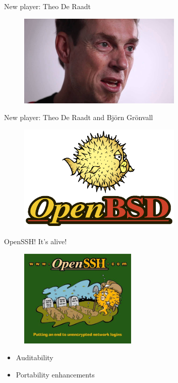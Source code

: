 \documentclass[10pt, compress, aspectratio=169]{beamer}
\begin{document}
\begin{frame}{New player: Theo De Raadt}
  \begin{figure}[ht]
    \centering
    \includegraphics[width=0.7\textwidth, keepaspectratio=true]{images/theoDeRaadt.jpg}
  \end{figure}
\end{frame}

\begin{frame}{New player: Theo De Raadt and Björn Grönvall}
  \begin{figure}[ht]
    \centering
    \includegraphics[width=0.7\textwidth, keepaspectratio=true]{images/openbsd.png}
  \end{figure}
\end{frame}

\begin{frame}{OpenSSH! It's alive!}
  \begin{figure}[ht]
    \centering
    \includegraphics[width=0.5\textwidth, keepaspectratio=true]{images/openssh.jpg}
  \end{figure}
  \begin{itemize}
    \item Auditability
    \item Portability enhancements
  \end{itemize}
\end{frame}
\end{document}
